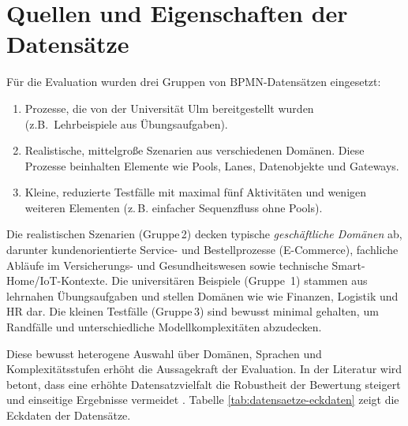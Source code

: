 \section{Quellen und Eigenschaften der Datensätze}\label{sec:quellen-und-eigenschaften-der-datensatze}

Für die Evaluation wurden drei Gruppen von \ac{BPMN}-Datensätzen eingesetzt:

\begin{enumerate}
    \item Prozesse, die von der Universität Ulm bereitgestellt wurden (z.B.\ Lehrbeispiele aus Übungsaufgaben).
    \item Realistische, mittelgroße Szenarien aus verschiedenen Domänen. Diese Prozesse beinhalten Elemente wie Pools, Lanes, Datenobjekte und Gateways.
    \item Kleine, reduzierte Testfälle mit maximal fünf Aktivitäten und wenigen weiteren Elementen (z.\,B. einfacher Sequenzfluss ohne Pools).
\end{enumerate}

Die realistischen Szenarien (Gruppe\,2) decken typische \emph{geschäftliche Domänen} ab, darunter kundenorientierte Service- und Bestellprozesse (E-Commerce), fachliche Abläufe im Versicherungs- und Gesundheitswesen sowie technische Smart-Home/IoT-Kontexte. Die universitären Beispiele (Gruppe~1) stammen aus lehrnahen Übungsaufgaben und stellen Domänen wie wie Finanzen, Logistik und HR dar. Die kleinen Testfälle (Gruppe\,3) sind bewusst minimal gehalten, um Randfälle und unterschiedliche Modellkomplexitäten abzudecken.

Diese bewusst heterogene Auswahl über Domänen, Sprachen und Komplexitätsstufen erhöht die Aussagekraft der Evaluation. In der Literatur wird betont, dass eine erhöhte Datensatzvielfalt die Robustheit der Bewertung steigert und einseitige Ergebnisse vermeidet \cite{blake2025datasetdiversity}. Tabelle \ref{tab:datensaetze-eckdaten} zeigt die Eckdaten der Datensätze.

